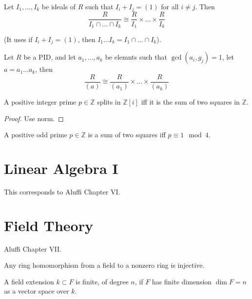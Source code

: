 \documentclass[openany]{book}
\newcommand{\Z}{\mathbb{Z}}
\begin{document}
\begin{thm}[CRT]
    Let $I_1,\dots, I_k$ be ideals of $R$ such that $I_i+I_j=(1)$ for all $i\neq j$. Then 
    \begin{equation*}
        \frac{R}{I_1\cap\dots\cap I_k}\cong\frac{R}{I_1}\times\dots\times\frac{R}{I_k}
    \end{equation*}

    (It uses if $I_i+I_j=(1)$, then $I_1\dots I_k=I_1\cap\dots\cap I_k$).
\end{thm}

\begin{cor}
    Let $R$ be a PID, and let $a_1,\dots, a_k$ be elemnts such that $\gcd(a_i,g_j)=1$, let $a=a_1\dots a_k$, then 
    \begin{equation*}
        \frac{R}{(a)}\cong\frac{R}{(a_1)}\times\dots\times\frac{R}{(a_k)}
    \end{equation*}
\end{cor}


\begin{prop}
    A positive integer prime $p\in\Z$ splits in $\Z[i]$ iff it is the sum of two squares in $\Z$.
\end{prop}
\begin{proof}
    Use norm.
\end{proof}


\begin{thm}[Fermat]
    A positive odd prime $p\in\Z$ is a sum of two squares iff $p\equiv 1\mod 4$.
\end{thm}












\chapter{Linear Algebra I}
This corresponds to Aluffi Chapter VI.


\chapter{Field Theory}

Aluffi Chapter VII.


\begin{prop}
    Any ring homomorphism from a field to a nonzero ring is injective.
\end{prop}


\begin{defn}
    A field extension $k\subset F$ is finite, of degree $n$, if $F$ has finite dimension $\dim F=n$ as a vector space over $k$.
\end{defn}
\end{document}
